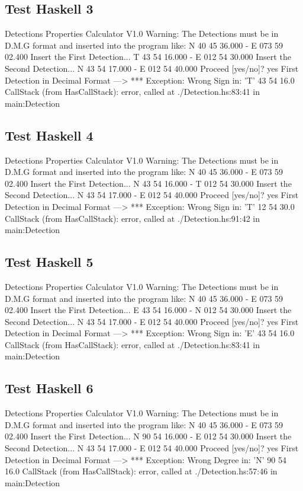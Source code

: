 \documentclass{article}
\begin{document}
\subsection*{Test Haskell 3}
	\begin{spverbatim}
		Detections Properties Calculator V1.0 
		Warning: The Detections must be in D.M.G format and inserted into the program like: N 40 45 36.000 - E 073 59 02.400
		Insert the First Detection...
		T 43 54 16.000 - E 012 54 30.000
		Insert the Second Detection...
		N 43 54 17.000 - E 012 54 40.000
		Proceed [yes/no]?
		yes
		First Detection in Decimal Format ---> *** Exception: Wrong Sign in:  'T' 43 54 16.0
		CallStack (from HasCallStack):
		error, called at ./Detection.hs:83:41 in main:Detection
	\end{spverbatim}

\subsection*{Test Haskell 4}
	\begin{spverbatim}
		Detections Properties Calculator V1.0 
		Warning: The Detections must be in D.M.G format and inserted into the program like: N 40 45 36.000 - E 073 59 02.400
		Insert the First Detection...
		N 43 54 16.000 - T 012 54 30.000
		Insert the Second Detection...
		N 43 54 17.000 - E 012 54 40.000
		Proceed [yes/no]?
		yes
		First Detection in Decimal Format ---> *** Exception: Wrong Sign in:  'T' 12 54 30.0
		CallStack (from HasCallStack):
		error, called at ./Detection.hs:91:42 in main:Detection
	\end{spverbatim}

\subsection*{Test Haskell 5}
	\begin{spverbatim}
		Detections Properties Calculator V1.0 
		Warning: The Detections must be in D.M.G format and inserted into the program like: N 40 45 36.000 - E 073 59 02.400
		Insert the First Detection...
		E 43 54 16.000 - N 012 54 30.000
		Insert the Second Detection...
		N 43 54 17.000 - E 012 54 40.000
		Proceed [yes/no]?
		yes
		First Detection in Decimal Format ---> *** Exception: Wrong Sign in:  'E' 43 54 16.0
		CallStack (from HasCallStack):
		error, called at ./Detection.hs:83:41 in main:Detection
	\end{spverbatim}

\subsection*{Test Haskell 6}
	\begin{spverbatim}
		Detections Properties Calculator V1.0 
		Warning: The Detections must be in D.M.G format and inserted into the program like: N 40 45 36.000 - E 073 59 02.400
		Insert the First Detection...
		N 90 54 16.000 - E 012 54 30.000
		Insert the Second Detection...
		N 43 54 17.000 - E 012 54 40.000
		Proceed [yes/no]?
		yes
		First Detection in Decimal Format ---> *** Exception: Wrong Degree in:  'N' 90 54 16.0
		CallStack (from HasCallStack):
		error, called at ./Detection.hs:57:46 in main:Detection
	\end{spverbatim}
\end{document}
